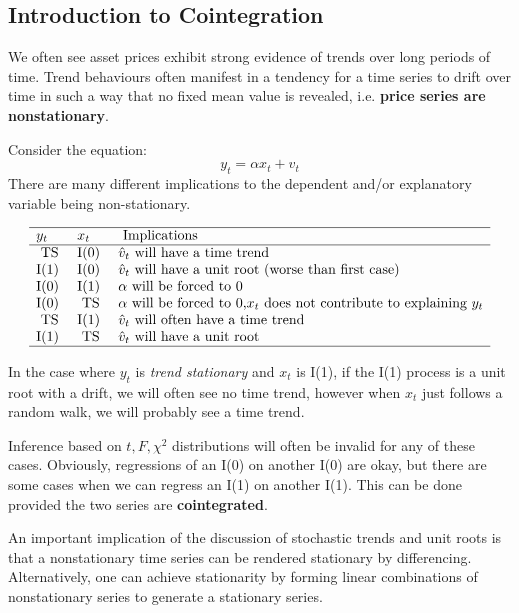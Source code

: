 \documentclass[11pt]{article}
\begin{document}
\subsection{Introduction to Cointegration}
We often see asset prices exhibit strong evidence of trends over long periods of time. Trend behaviours often manifest in a tendency for a time series to drift over time in such a way that no fixed mean value is revealed, i.e. \textbf{price series are nonstationary}.

Consider the equation:
\[y_t = \alpha x_t + v_t\]
There are many different implications to the dependent and/or explanatory variable being non-stationary.

\begin{equation}
\begin{array}{lll}
\hline y_t & x_t & \text { Implications } \\
\hline \text { TS } & \mathrm{I}(0) & \hat{v}_t \text{ will have a time trend}\\
\mathrm{I}(1) & \mathrm{I}(0) & \hat{v}_t \text{ will have a unit root (worse than first case)}\\
\mathrm{I}(0) & \mathrm{I}(1) & \alpha \text{ will be forced to 0}\\
\mathrm{I}(0) & \text { TS } & \alpha \text { will be forced to 0,} x_t \text{ does not contribute to explaining } y_t\\
\text { TS } & \mathrm{I}(1) &  \hat{v}_t\text { will often have a time trend}\\
\mathrm{I}(1) & \text { TS } & \hat{v}_t \text{ will have a unit root} \\
\hline
\end{array}
\end{equation}



In the case where $y_t$ is \textit{trend stationary} and $x_t$ is I(1), if the I(1) process is a unit root with a drift, we will often see no time trend, however when $x_t$ just follows a random walk, we will probably see a time trend.

Inference based on $t, F, \chi^2$ distributions will often be invalid for any of these cases. Obviously, regressions of an I(0) on another I(0) are okay, but there are some cases when we can regress an I(1) on another I(1). This can be done provided the two series are \textbf{cointegrated}.

An important implication of the discussion of stochastic trends and unit roots is that a nonstationary time series can be rendered stationary by differencing. Alternatively, one can achieve stationarity by forming linear combinations of nonstationary series to generate a stationary series.
\end{document}

